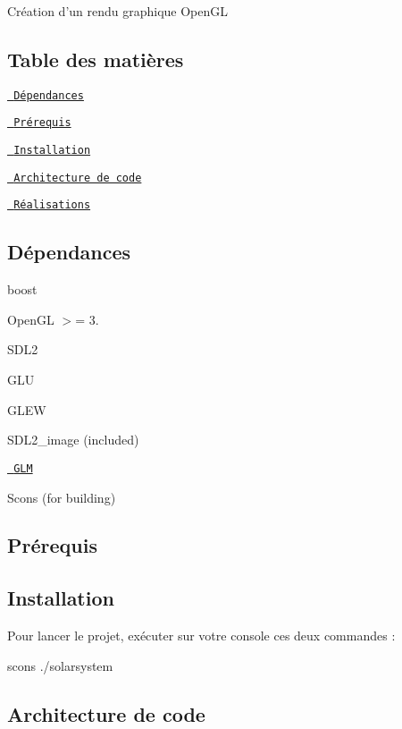 Création d’un rendu graphique Open\+GL

\subsection*{Table des matières}


\begin{DoxyItemize}
\item \href{\#dépendances}{\texttt{ Dépendances}}
\item \href{\#prérequis}{\texttt{ Prérequis}}
\item \href{\#installation}{\texttt{ Installation}}
\item \href{\#architecture-de-code}{\texttt{ Architecture de code}}
\item \href{\#réalisations}{\texttt{ Réalisations}}
\end{DoxyItemize}

\subsection*{Dépendances}


\begin{DoxyItemize}
\item boost
\item Open\+GL $>$= 3.
\item S\+D\+L2
\item G\+LU
\item G\+L\+EW
\item S\+D\+L2\+\_\+image (included)
\item \href{http://glm.g-truc.net/0.9.4/index.html}{\texttt{ G\+LM}}
\item Scons (for building)
\end{DoxyItemize}

\subsection*{Prérequis}

\subsection*{Installation}

Pour lancer le projet, exécuter sur votre console ces deux commandes \+: \begin{DoxyVerb}scons
./solarsystem
\end{DoxyVerb}


\subsection*{Architecture de code}


